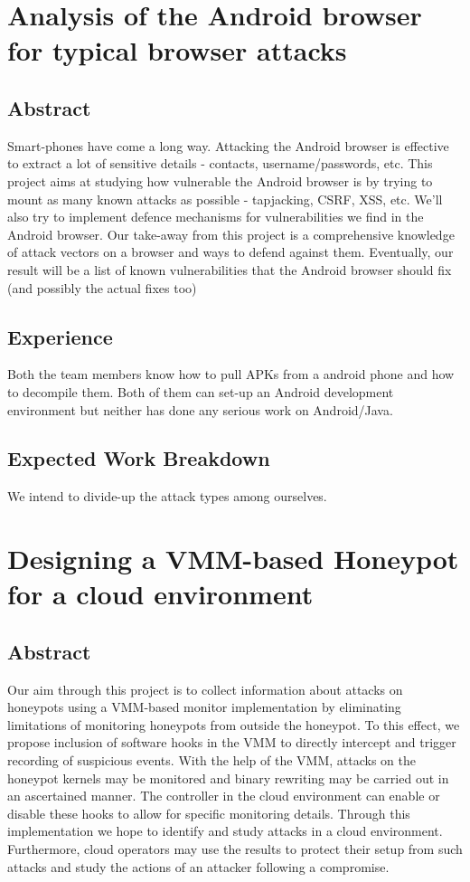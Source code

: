 \documentclass[11pt,pdftex]{article}
\begin{document}
\section{Analysis of the Android browser for typical browser attacks}

\subsection{Abstract}

Smart-phones have come a long way. Attacking the Android browser is effective to extract a lot of sensitive details - contacts, username/passwords, etc. This project aims at studying how vulnerable the Android browser is by trying to mount as many known attacks as possible - tapjacking, CSRF, XSS, etc. We'll also try to implement defence mechanisms for vulnerabilities we find in the Android browser. Our take-away from this project is a comprehensive knowledge of attack vectors on a browser and ways to defend against them. Eventually, our result will be a list of known vulnerabilities that the Android browser should fix (and possibly the actual fixes too)

\subsection{Experience}

Both the team members know how to pull APKs from a android phone and how to decompile them. Both of them can set-up an Android development environment but neither has done any serious work on Android/Java.

\subsection{Expected Work Breakdown}

We intend to divide-up the attack types among ourselves.

\section{Designing a VMM-based Honeypot for a cloud environment}

\subsection{Abstract}

Our aim through this project is to collect information about attacks on honeypots  using a VMM-based monitor implementation by eliminating limitations of monitoring honeypots from outside the honeypot. To this effect, we propose inclusion of software hooks in the VMM to directly intercept and trigger recording of suspicious events. With the help of the VMM, attacks on the honeypot kernels may be monitored and binary rewriting may be carried out in an ascertained manner. The controller in the cloud environment can enable or disable these hooks to allow for specific monitoring details. Through this implementation we hope to identify and study attacks in a cloud environment. Furthermore, cloud operators may use the results to protect their setup from such attacks and study the actions of an attacker following a compromise.
\end{document}
